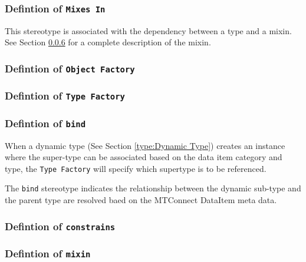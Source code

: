 \FloatBarrier



\subsubsection{Defintion of \texttt{Mixes  In}} \label{type:Mixes  In}

\FloatBarrier

This stereotype is associated with the dependency between a type and a mixin. See Section \ref{type:mixin} for a complete 
description of the mixin.

\subsubsection{Defintion of \texttt{Object Factory}} \label{type:Object Factory}

\FloatBarrier



\subsubsection{Defintion of \texttt{Type Factory}} \label{type:Type Factory}

\FloatBarrier



\subsubsection{Defintion of \texttt{bind}} \label{type:bind}

\FloatBarrier

When a dynamic type (See Section \ref{type:Dynamic Type}) creates an instance where the super-type
can be associated based on the data item category and type, the \texttt{Type Factory} will 
specify which supertype is to be referenced.

The \texttt{bind} stereotype indicates the relationship between the dynamic sub-type and the 
parent type are resolved baed on the MTConnect DataItem meta data.

\subsubsection{Defintion of \texttt{constrains}} \label{type:constrains}

\FloatBarrier



\subsubsection{Defintion of \texttt{mixin}} \label{type:mixin}

